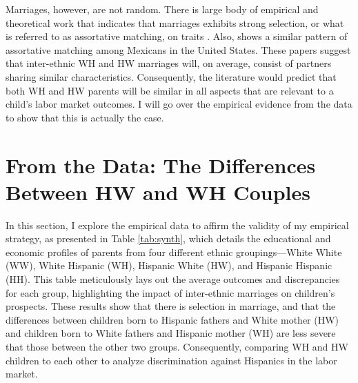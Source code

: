 \documentclass[12pt,english]{article}
\begin{document}
Marriages, however, are not random. There is large body of empirical and theoretical work that indicates that marriages exhibits strong selection, or what is referred to as assortative matching, on traits \autocite{averettBetterWorseRelationship2008, averettEconomicRealityBeauty1996, beckerTheoryMarriagePart1973, beckerTheoryMarriagePart1974, beckerTreatiseFamily1993, browningCollectiveUnitaryModels2006, chiapporiFatterAttractionAnthropometric2012}. Also, \textcite{duncanIntermarriageIntergenerationalTransmission2011} shows a similar pattern of assortative matching among Mexicans in the United States. These papers suggest that inter-ethnic WH and HW marriages will, on average, consist of partners sharing similar characteristics. Consequently, the literature would predict that both WH and HW parents will be similar in all aspects that are relevant to a child's labor market outcomes. I will go over the empirical evidence from the data to show that this is actually the case.

\section{From the Data: The Differences Between HW and WH Couples}\label{sec:hw-wh-couples-data}

In this section, I explore the empirical data to affirm the validity of my empirical strategy, as presented in Table \ref{tab:synth}, which details the educational and economic profiles of parents from four different ethnic groupings—White White (WW), White Hispanic (WH), Hispanic White (HW), and Hispanic Hispanic (HH). This table meticulously lays out the average outcomes and discrepancies for each group, highlighting the impact of inter-ethnic marriages on children's prospects. These results show that there is selection in marriage, and that the differences between children born to Hispanic fathers and White mother (HW) and children born to White fathers and Hispanic mother (WH) are less severe that those between the other two groups. Consequently, comparing WH and HW children to each other to analyze discrimination against Hispanics in the labor market.
\end{document}
